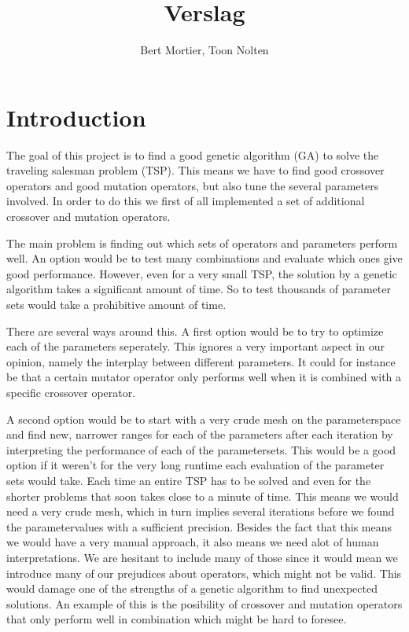 \documentclass[a4paper]{article}
\title{Verslag}
\author{Bert Mortier, Toon Nolten}
\date{}
\begin{document}
\maketitle

\section{Introduction}

The goal of this project is to find a good genetic algorithm (GA) to solve the traveling salesman problem (TSP). This means we have to find good crossover operators and good mutation operators, but also tune the several parameters involved. In order to do this we first of all implemented a set of additional crossover and mutation operators.
\par
The main problem is finding out which sets of operators and parameters perform well. An option would be to test many combinations and evaluate which ones give good performance. However, even for a very small TSP, the solution by a genetic algorithm takes a significant amount of time. So to test thousands of parameter sets would take a prohibitive amount of time.
\par
There are several ways around this. A first option would be to try to optimize each of the parameters seperately. This ignores a very important aspect in our opinion, namely the interplay between different parameters. It could for instance be that a certain mutator operator only performs well when it is combined with a specific crossover operator. 
\par 
A second option would be to start with a very crude mesh on the parameterspace and find new, narrower ranges for each of the parameters after each iteration by interpreting the performance of each of the parametersets. This would be a good option if it weren't for the very long runtime each evaluation of the parameter sets would take. Each time an entire TSP has to be solved and even for the shorter problems that soon takes close to a minute of time. This means we would need a very crude mesh, which in turn implies several iterations before we found the parametervalues with a sufficient precision. Besides the fact that this means we would have a very manual approach, it also means we need alot of human interpretations. We are hesitant to include many of those since it would mean we introduce many of our prejudices about operators, which might not be valid. This would damage one of the strengths of a genetic algorithm to find unexpected solutions.
An example of this is the posibility of crossover and mutation operators that only perform well in combination which might be hard to foresee.
\end{document}
